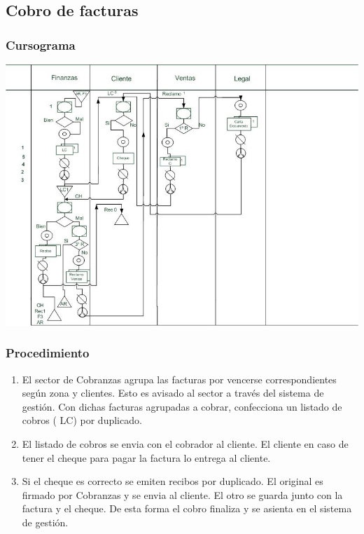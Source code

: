 \subsection{Cobro de facturas}

\subsubsection{Cursograma}

\includegraphics[scale=0.7]{Empresa/Circuitos/Cobranzas/cursograma-manual-cobranzas.jpg}

\subsubsection{Procedimiento}

\begin{enumerate}
\item El sector de Cobranzas agrupa las facturas por vencerse correspondientes seg\'un zona y clientes. Esto es avisado al sector a trav\'es del sistema de gesti\'on. Con dichas facturas agrupadas a cobrar, confecciona un listado de cobros ( LC) por duplicado.

\item El listado de cobros se envia con el cobrador al cliente. El cliente en caso de tener el cheque para pagar la factura lo entrega al cliente.

\item Si el cheque es correcto se emiten recibos por duplicado. El original es firmado por Cobranzas y se envia al cliente. El otro se guarda junto con la factura y el cheque. De esta forma el cobro finaliza y se asienta en el sistema de gesti\'on.
\end{enumerate}